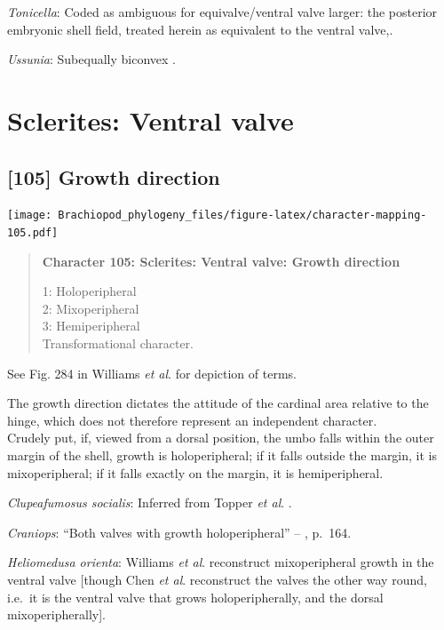 \documentclass[openany]{book}
\begin{document}
\hypertarget{Tonicella-coding-104}{}
\emph{Tonicella}: Coded as ambiguous for equivalve/ventral valve larger:
the posterior embryonic shell field, treated herein as equivalent to the
ventral valve,.

\hypertarget{Ussunia-coding-104}{}
\emph{Ussunia}: Subequally biconvex
\citep[p.~192]{Williams2000LinguliformeaCraniiformea}.

\section{Sclerites: Ventral valve}\label{sclerites-ventral-valve}

\subsection*{{[}105{]} Growth direction}\label{growth-direction-1}

\texttt{[image: Brachiopod\_phylogeny\_files/figure-latex/character-mapping-105.pdf]}

\begin{quote}
\textbf{Character 105: Sclerites: Ventral valve: Growth direction}

1: Holoperipheral\\
2: Mixoperipheral\\
3: Hemiperipheral\\
Transformational character.
\end{quote}

See Fig. 284 in Williams \emph{et al}.
\citeyearpar{Williams1997Introduction} for depiction of terms.

The growth direction dictates the attitude of the cardinal area relative
to the hinge, which does not therefore represent an independent
character.\\
Crudely put, if, viewed from a dorsal position, the umbo falls within
the outer margin of the shell, growth is holoperipheral; if it falls
outside the margin, it is mixoperipheral; if it falls exactly on the
margin, it is hemiperipheral.

\hypertarget{Clupeafumosus_socialis-coding-105}{}
\emph{Clupeafumosus socialis}: Inferred from Topper \emph{et al}.
\citeyearpar{Topper2013Reappraisalof}.

\hypertarget{Craniops-coding-105}{}
\emph{Craniops}: ``Both valves with growth holoperipheral'' --
\citet{Williams2000LinguliformeaCraniiformea}, p.~164.

\hypertarget{Heliomedusa_orienta-coding-105}{}
\emph{Heliomedusa orienta}: Williams \emph{et al}.
\citeyearpar[2007]{Williams2000LinguliformeaCraniiformea} reconstruct
mixoperipheral growth in the ventral valve {[}though Chen \emph{et al}.
\citeyearpar{Chen2007Reinterpretationof} reconstruct the valves the
other way round, i.e.~it is the ventral valve that grows
holoperipherally, and the dorsal mixoperipherally{]}.
\end{document}
